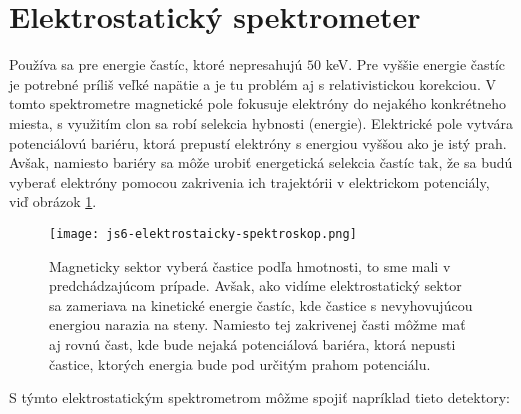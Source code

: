 \documentclass[../../main.tex]{subfiles}
\begin{document}
\section{Elektrostatický spektrometer}
Používa sa pre energie častíc, ktoré nepresahujú $50$ keV. Pre vyššie energie častíc je potrebné príliš veľké napätie a je tu problém aj s relativistickou korekciou. V tomto spektrometre magnetické pole fokusuje elektróny do nejakého konkrétneho miesta, s využitím clon sa robí selekcia hybnosti (energie). Elektrické pole vytvára potenciálovú bariéru, ktorá prepustí elektróny s energiou vyššou ako je istý prah. Avšak, namiesto bariéry sa môže urobiť energetická selekcia častíc tak, že sa budú vyberať elektróny pomocou zakrivenia ich trajektórii v elektrickom potenciály, viď obrázok \ref{js6:fig:elektrostaticky_spektrometer}.
\begin{figure}[!h]
\centering
\texttt{[image: js6-elektrostaicky-spektroskop.png]}
\caption{Magneticky sektor vyberá častice podľa hmotnosti, to sme mali v predchádzajúcom prípade. Avšak, ako vidíme elektrostatický sektor sa zameriava na kinetické energie častíc, kde častice s nevyhovujúcou energiou narazia na steny. Namiesto tej zakrivenej časti môžme mať aj rovnú čast, kde bude nejaká potenciálová bariéra, ktorá nepusti častice, ktorých energia bude pod určitým prahom potenciálu.}
\label{js6:fig:elektrostaticky_spektrometer}
\end{figure}
S týmto elektrostatickým spektrometrom môžme spojiť napríklad tieto detektory:
\end{document}
